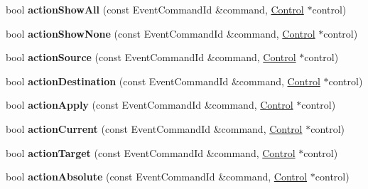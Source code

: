 \begin{DoxyCompactItemize}
\item 
bool {\bfseries action\+Show\+All} (const Event\+Command\+Id \&command, \hyperlink{classControl}{Control} $\ast$control)\hypertarget{classNavComputer_a1121b84de1b40e876bd4e325acd437d2}{}\label{classNavComputer_a1121b84de1b40e876bd4e325acd437d2}

\item 
bool {\bfseries action\+Show\+None} (const Event\+Command\+Id \&command, \hyperlink{classControl}{Control} $\ast$control)\hypertarget{classNavComputer_adf763b917fb88ddb976f0126aa518b46}{}\label{classNavComputer_adf763b917fb88ddb976f0126aa518b46}

\item 
bool {\bfseries action\+Source} (const Event\+Command\+Id \&command, \hyperlink{classControl}{Control} $\ast$control)\hypertarget{classNavComputer_a3b34a85b2afb960b55259975df0c8ac1}{}\label{classNavComputer_a3b34a85b2afb960b55259975df0c8ac1}

\item 
bool {\bfseries action\+Destination} (const Event\+Command\+Id \&command, \hyperlink{classControl}{Control} $\ast$control)\hypertarget{classNavComputer_a3d24cb7cecc2d24fc93eb716f52e5a96}{}\label{classNavComputer_a3d24cb7cecc2d24fc93eb716f52e5a96}

\item 
bool {\bfseries action\+Apply} (const Event\+Command\+Id \&command, \hyperlink{classControl}{Control} $\ast$control)\hypertarget{classNavComputer_adbefb3cd9096e8363dd4ceacd7c6e3a5}{}\label{classNavComputer_adbefb3cd9096e8363dd4ceacd7c6e3a5}

\item 
bool {\bfseries action\+Current} (const Event\+Command\+Id \&command, \hyperlink{classControl}{Control} $\ast$control)\hypertarget{classNavComputer_a4b79bb521082adb453bcdf3d78529ba5}{}\label{classNavComputer_a4b79bb521082adb453bcdf3d78529ba5}

\item 
bool {\bfseries action\+Target} (const Event\+Command\+Id \&command, \hyperlink{classControl}{Control} $\ast$control)\hypertarget{classNavComputer_acfe9e3f507bae9964b3d38c84640c52b}{}\label{classNavComputer_acfe9e3f507bae9964b3d38c84640c52b}

\item 
bool {\bfseries action\+Absolute} (const Event\+Command\+Id \&command, \hyperlink{classControl}{Control} $\ast$control)\hypertarget{classNavComputer_aa498c8a4d9e6c7945b076c98141b67fc}{}\label{classNavComputer_aa498c8a4d9e6c7945b076c98141b67fc}


\end{DoxyCompactItemize}
